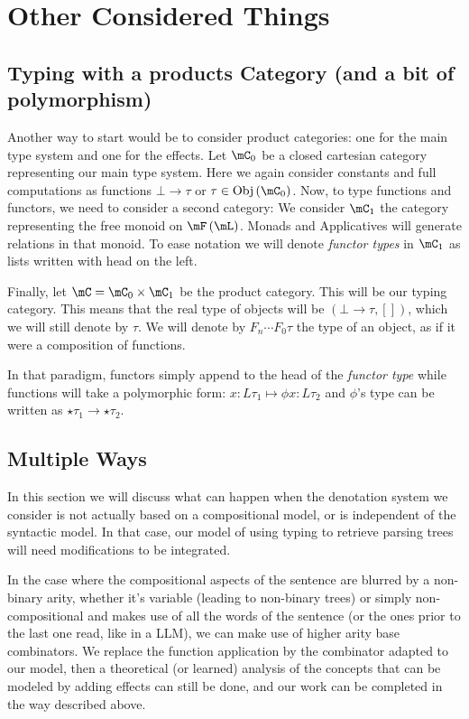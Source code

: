 \section{Other Considered Things}
\subsection{Typing with a products Category (and a bit of polymorphism)}
\label{app:prodcat}
Another way to start would be to consider product categories: one for the main
type system and one for the effects.
Let $\mC_{0}$ be a closed cartesian category representing our main type system.
Here we again consider constants and full computations as functions
$\bot \to \tau$ or $\tau \in \mathrm{Obj}\left( \mC_{0} \right)$.
Now, to type functions and functors, we need to consider a second category:
We consider $\mC_{1}$ the category representing the free monoid on
$\mF\left( \mL \right)$.
Monads and Applicatives will generate relations in that monoid.
To ease notation we will denote \emph{functor types} in $\mC_{1}$ as lists
written with head on the left.

Finally, let $\mC = \mC_{0} \times \mC_{1}$ be the product category.
This will be our typing category.
This means that the real type of objects will be
$\left( \bot \to \tau, [] \right)$, which we will still denote by $\tau$.
We will denote by $F_{n} \cdots F_{0} \tau$ the type of an object, as if it
were a composition of functions.

In that paradigm, functors simply append to the head of the \emph{functor type}
while functions will take a polymorphic form:
$x: L\tau_{1} \mapsto \phi x: L\tau_{2}$ and $\phi$'s type can be written as
$\star\tau_{1} \to \star\tau_{2}$.

\subsection{Multiple Ways}
\label{app:arities-and-denots}
In this section we will discuss what can happen when the denotation system
we consider is not actually based on a compositional model, or is independent
of the syntactic model.
In that case, our model of using typing to retrieve parsing trees will need
modifications to be integrated.

In the case where the compositional aspects of the sentence are blurred by a
non-binary arity, whether it's variable (leading to non-binary trees) or simply
non-compositional and makes use of all the words of the sentence (or the ones
prior to the last one read, like in a LLM), we can make use of higher arity
base combinators.
We replace the function application by the combinator adapted to our model,
then a theoretical (or learned) analysis of the concepts that can be modeled
by adding effects can still be done, and our work can be completed in the way
described above.

